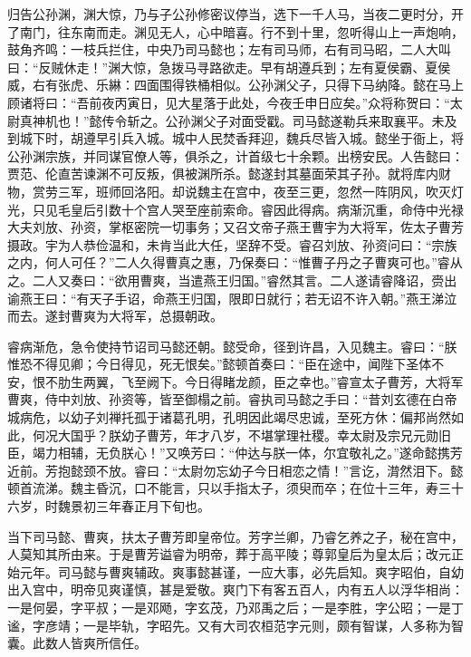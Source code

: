 归告公孙渊，渊大惊，乃与子公孙修密议停当，选下一千人马，当夜二更时分，开了南门，往东南而走。渊见无人，心中暗喜。行不到十里，忽听得山上一声炮响，鼓角齐鸣：一枝兵拦住，中央乃司马懿也；左有司马师，右有司马昭，二人大叫曰：“反贼休走！”渊大惊，急拨马寻路欲走。早有胡遵兵到；左有夏侯霸、夏侯威，右有张虎、乐綝：四面围得铁桶相似。公孙渊父子，只得下马纳降。懿在马上顾诸将曰：“吾前夜丙寅日，见大星落于此处，今夜壬申日应矣。”众将称贺曰：“太尉真神机也！”懿传令斩之。公孙渊父子对面受戳。司马懿遂勒兵来取襄平。未及到城下时，胡遵早引兵入城。城中人民焚香拜迎，魏兵尽皆入城。懿坐于衙上，将公孙渊宗族，并同谋官僚人等，俱杀之，计首级七十余颗。出榜安民。人告懿曰：贾范、伦直苦谏渊不可反叛，俱被渊所杀。懿遂封其墓面荣其子孙。就将库内财物，赏劳三军，班师回洛阳。却说魏主在宫中，夜至三更，忽然一阵阴风，吹灭灯光，只见毛皇后引数十个宫人哭至座前索命。睿因此得病。病渐沉重，命侍中光禄大夫刘放、孙资，掌枢密院一切事务；又召文帝子燕王曹宇为大将军，佐太子曹芳摄政。宇为人恭俭温和，未肯当此大任，坚辞不受。睿召刘放、孙资问曰：“宗族之内，何人可任？”二人久得曹真之惠，乃保奏曰：“惟曹子丹之子曹爽可也。”睿从之。二人又奏曰：“欲用曹爽，当遣燕王归国。”睿然其言。二人遂请睿降诏，赍出谕燕王曰：“有天子手诏，命燕王归国，限即日就行；若无诏不许入朝。”燕王涕泣而去。遂封曹爽为大将军，总摄朝政。

睿病渐危，急令使持节诏司马懿还朝。懿受命，径到许昌，入见魏主。睿曰：“朕惟恐不得见卿；今日得见，死无恨矣。”懿顿首奏曰：“臣在途中，闻陛下圣体不安，恨不肋生两翼，飞至阙下。今日得睹龙颜，臣之幸也。”睿宣太子曹芳，大将军曹爽，侍中刘放、孙资等，皆至御榻之前。睿执司马懿之手曰：“昔刘玄德在白帝城病危，以幼子刘禅托孤于诸葛孔明，孔明因此竭尽忠诚，至死方休：偏邦尚然如此，何况大国乎？朕幼子曹芳，年才八岁，不堪掌理社稷。幸太尉及宗兄元勋旧臣，竭力相辅，无负朕心！”又唤芳曰：“仲达与朕一体，尔宜敬礼之。”遂命懿携芳近前。芳抱懿颈不放。睿曰：“太尉勿忘幼子今日相恋之情！”言讫，潸然泪下。懿顿首流涕。魏主昏沉，口不能言，只以手指太子，须臾而卒；在位十三年，寿三十六岁，时魏景初三年春正月下旬也。

当下司马懿、曹爽，扶太子曹芳即皇帝位。芳字兰卿，乃睿乞养之子，秘在宫中，人莫知其所由来。于是曹芳谥睿为明帝，葬于高平陵；尊郭皇后为皇太后；改元正始元年。司马懿与曹爽辅政。爽事懿甚谨，一应大事，必先启知。爽字昭伯，自幼出入宫中，明帝见爽谨慎，甚是爱敬。爽门下有客五百人，内有五人以浮华相尚：一是何晏，字平叔；一是邓飏，字玄茂，乃邓禹之后；一是李胜，字公昭；一是丁谧，字彦靖；一是毕轨，字昭先。又有大司农桓范字元则，颇有智谋，人多称为智囊。此数人皆爽所信任。

